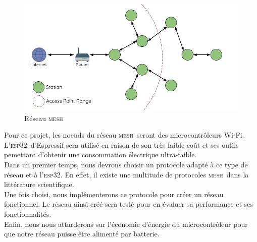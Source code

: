 \documentclass[a4paper, 12pt]{report}
\newcommand{\esp}{\textsc{esp32}}
\newcommand{\mesh}{\textsc{mesh}}
\newcommand{\wifi}{Wi-Fi}
\begin{document}
    \begin{figure}[H]
        \centering
        \includegraphics[scale=0.4]{images/mesh-esp-mesh-network-architecture.png}
        \caption{Réseau \mesh\ \cite{esp-mesh_w}}
        \label{mesh-network-pic}
    \end{figure}

    
    Pour ce projet, les noeuds du réseau \mesh\ seront des microcontrôleurs \wifi. 
    L'\esp\ d'Espressif sera utilisé en raison de son très faible coût et
    ses outils pemettant d'obtenir une consommation électrique ultra-faible.\\

    Dans un premier temps, nous devrons choisir un protocole adapté à ce type
    de réseau et à l'\esp. En effet, il existe une multitude de protocoles
    \mesh\ dans la littérature scientifique.\\

    Une fois choisi, nous implémenterons ce protocole pour créer un
    réseau fonctionnel. Le réseau ainsi créé sera testé pour en évaluer sa performance et ses fonctionnalités.\\

    Enfin, nous nous attarderons sur l'économie d'énergie du microcontrôleur pour
    que notre réseau puisse être alimenté par batterie.


\tableofcontents
\newpage









{}

\end{document}
